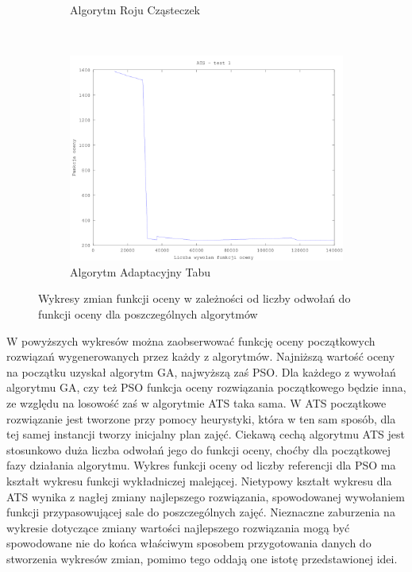 \begin{figure}[H]
\begin{subfigure}[b]{0.5\textwidth}
                \caption{Algorytm Roju Cząsteczek}
        \end{subfigure}
        ~ %
          \\
        \begin{subfigure}[b]{0.5\textwidth}
                \includegraphics[width=\textwidth]{ats_test_1.png}
                \caption{Algorytm Adaptacyjny Tabu}
        \end{subfigure}
        \caption{Wykresy zmian funkcji oceny w zależności od liczby odwołań do funkcji oceny dla poszczególnych algorytmów}
\end{figure}

W powyższych wykresów można zaobserwować funkcję oceny początkowych rozwiązań wygenerowanych przez każdy z algorytmów. Najniższą wartość oceny na początku uzyskał algorytm GA, najwyższą zaś PSO. Dla każdego z wywołań algorytmu GA, czy też PSO funkcja oceny rozwiązania początkowego będzie inna, ze względu na losowość zaś w algorytmie ATS taka sama. W ATS początkowe rozwiązanie jest tworzone przy pomocy heurystyki, która w ten sam sposób, dla tej samej instancji tworzy inicjalny plan zajęć. Ciekawą cechą algorytmu ATS jest stosunkowo duża liczba odwołań jego do funkcji oceny, choćby dla początkowej fazy działania algorytmu. Wykres funkcji oceny od liczby referencji dla PSO ma kształt wykresu funkcji wykładniczej malejącej. Nietypowy kształt wykresu dla ATS wynika z nagłej zmiany najlepszego rozwiązania, spowodowanej wywołaniem funkcji przypasowującej sale do poszczególnych zajęć. Nieznaczne zaburzenia na wykresie dotyczące zmiany wartości najlepszego rozwiązania mogą być spowodowane nie do końca właściwym sposobem przygotowania danych do stworzenia wykresów zmian, pomimo tego oddają one istotę przedstawionej idei.
